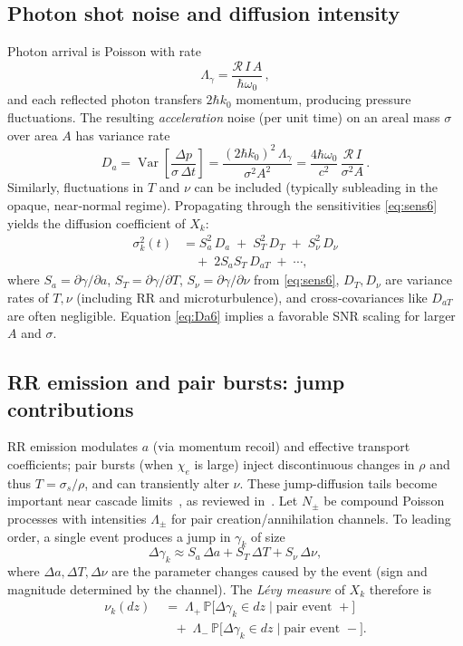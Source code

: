 \documentclass[aps,pre,twocolumn,showpacs,superscriptaddress]{revtex4-2}
\theoremstyle{definition}
\newcommand{\PP}{\mathbb{P}}
\newcommand{\Var}{\operatorname{Var}}
\begin{document}
\subsection{Photon shot noise and diffusion intensity}\label{subsec:shot6}

Photon arrival is Poisson with rate
\[
\Lambda_\gamma = \frac{\mathcal{R}\,I\,A}{\hbar\omega_0}\,,
\]
and each reflected photon transfers $2\hbar k_0$ momentum, producing pressure fluctuations. The resulting \emph{acceleration} noise (per unit time) on an areal mass $\sigma$ over area $A$ has variance rate
\begin{equation}\label{eq:Da6}
D_a
= \Var\!\left[\frac{\Delta p}{\sigma\,\Delta t}\right]
= \frac{(2\hbar k_0)^2\,\Lambda_\gamma}{\sigma^2 A^2}
= \frac{4\hbar\omega_0}{c^2}\,\frac{\mathcal{R}\,I}{\sigma^2 A}\,.
\end{equation}
Similarly, fluctuations in $T$ and $\nu$ can be included (typically subleading in the opaque, near‑normal regime). Propagating through the sensitivities \eqref{eq:sens6} yields the diffusion coefficient of $X_k$:
\begin{align}\label{eq:sigk6}
\sigma_k^2(t) &= S_a^2\,D_a \;+\; S_T^2\,D_T \;+\; S_\nu^2\,D_\nu \nonumber\\
&\quad +\; 2 S_aS_T\,D_{aT} \;+\; \cdots,
\end{align}
where $S_a=\partial\gamma/\partial a$, $S_T=\partial\gamma/\partial T$, $S_\nu=\partial\gamma/\partial \nu$ from \eqref{eq:sens6}, $D_T,D_\nu$ are variance rates of $T,\nu$ (including RR and microturbulence), and cross‑covariances like $D_{aT}$ are often negligible. Equation \eqref{eq:Da6} implies a favorable SNR scaling for larger $A$ and $\sigma$.

\subsection{RR emission and pair bursts: jump contributions}\label{subsec:jump6}

RR emission modulates $a$ (via momentum recoil) and effective transport coefficients; pair bursts (when $\chi_e$ is large) inject discontinuous changes in $\rho$ and thus $T=\sigma_s/\rho$, and can transiently alter $\nu$. These jump-diffusion tails become important near cascade limits~\cite{Fedotov2010PRL}, as reviewed in~\cite{DiPiazza2012RMP,Gonoskov2022RMP}. Let $N_\pm$ be compound Poisson processes with intensities $\Lambda_\pm$ for pair creation/annihilation channels. To leading order, a single event produces a jump in $\gamma_k$ of size
\[
\Delta\gamma_k \approx S_a\,\Delta a + S_T\,\Delta T + S_\nu\,\Delta \nu,
\]
where $\Delta a,\Delta T,\Delta \nu$ are the parameter changes caused by the event (sign and magnitude determined by the channel). The \emph{L\'evy measure} of $X_k$ therefore is
\begin{align}\label{eq:levy6}
\nu_k(dz) &\;=\; \Lambda_+\,\PP\big[\Delta\gamma_k\in dz\mid \text{pair event }+\big] \nonumber\\
&\quad+\; \Lambda_-\,\PP\big[\Delta\gamma_k\in dz\mid \text{pair event }-\big].
\end{align}
\end{document}
